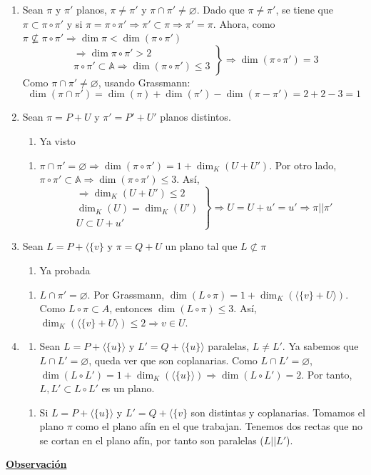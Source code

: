 \documentclass[12pt, a4paper, ones, notitlepage, openany,titlepage]{article}
\newcommand{\dobleimplicacion}[2]{
	\begin{enumerate}[label=$\Rightarrow/$]
		\item #1
	\end{enumerate}
	\begin{enumerate}[label=$\Leftarrow/$]
		\item #2
	\end{enumerate}
}
\newcommand{\observacion}{\noindent\underline{\textbf{Observación}}}
\begin{document}
\begin{enumerate}[label=(\alph*)]
	\item Sean $\pi$ y $\pi'$ planos, $\pi \neq \pi'$ y $\pi \cap \pi' \neq \varnothing$. Dado que $\pi \neq \pi'$, se tiene que $\pi \subset \pi \circ \pi'$ y si $\pi = \pi \circ \pi' \Longrightarrow \pi' \subset \pi \Longrightarrow \pi' = \pi$. Ahora, como $\pi \not\subseteq \pi \circ \pi' \Longrightarrow \dim \pi < \dim(\pi \circ \pi')$
	$$
	\left. \begin{array}{r}
		\Longrightarrow \dim \pi \circ \pi' > 2 \\
		\pi \circ \pi' \subset \mathbb{A} \Longrightarrow \dim(\pi \circ \pi') \le 3
	\end{array} \right\} \Longrightarrow \dim(\pi \circ \pi') = 3
	$$
	Como $\pi \cap \pi' \neq \varnothing$, usando Grassmann:
	$$
	\dim(\pi \cap \pi') = \dim(\pi) + \dim(\pi') - \dim(\pi - \pi') = 2 + 2 - 3 = 1
	$$
	
	\item Sean $\pi = P + U$ y $\pi' = P' + U'$ planos distintos.
	\dobleimplicacion{Ya visto}{
	$\pi \cap \pi' = \varnothing \Longrightarrow \dim(\pi \circ \pi') = 1 + \dim_K (U + U')$. Por otro lado, $\pi \circ \pi' \subset \mathbb{A} \Longrightarrow \dim(\pi \circ \pi') \le 3$. Así,
	$$
	\left. \begin{array}{r}
		\Longrightarrow \dim_K (U + U') \le 2 \\
		\dim_K (U) = \dim_K (U') \\
		U \subset U + u'
	\end{array} \right\} \Longrightarrow U = U + u' = u' \Longrightarrow \pi || \pi'
	$$}
	
	\item Sean $L = P + \langle\{v\}$ y $\pi = Q + U$ un plano tal que $L \not\subset \pi$
	\dobleimplicacion{Ya probada}{
	$L \cap \pi' = \varnothing$. Por Grassmann, $\dim (L \circ \pi) = 1 + \dim_K (\langle\{v\} + U \rangle)$. Como $L \circ \pi \subset A$, entonces $\dim (L \circ \pi) \le 3$. Así, $\dim_K (\langle\{v\} + U \rangle) \le 2 \Longrightarrow v \in U$.
	}
	
	\item
	\dobleimplicacion
	{Sean $L = P + \langle\{u\}\rangle$ y $L' = Q + \langle\{u\}\rangle$ paralelas, $L \neq L'$. Ya sabemos que $L \cap L' = \varnothing$, queda ver que son coplanarias. Como $L \cap L' = \varnothing$, $\dim (L \circ L') = 1 + \dim_K (\langle \{u\} \rangle) \Longrightarrow \dim (L \circ L') = 2$. Por tanto, $L, L' \subset L \circ L'$ es un plano.}
	{Si $L = P + \langle\{u\}\rangle$ y $L' = Q + \langle\{v\}$ son distintas y coplanarias. Tomamos el plano $\pi$ como el plano afín en el que trabajan. Tenemos dos rectas que no se cortan en el plano afín, por tanto son paralelas ($L||L'$).}
\end{enumerate}
\observacion
\end{document}
